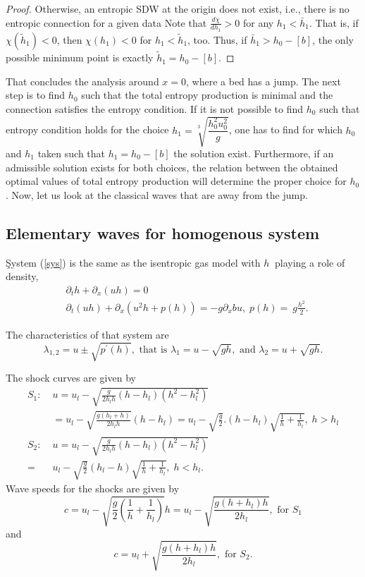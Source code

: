 \documentclass{article}
\theoremstyle{plain}
\theoremstyle{definition}
\theoremstyle{remark}
\begin{document}
\begin{proof}
Otherwise, an entropic SDW at the origin does not exist, i.e.,
there is no entropic connection for a given data
Note that $\frac{d\chi}{dh_1}>0$ for any $h_1<\bar{h}_1$. That is,
if $\chi(\tilde{h}_1)<0$, then $\chi(h_1)<0$ for $h_1<\tilde{h}_1$, too.
Thus, if $\bar{h}_1>h_0-[b]$, the only possible minimum point is
exactly $\tilde{h}_1=h_0-[b]$.
\end{proof}
\medskip


That concludes the analysis around $x=0$, where a bed has a jump. 
The next step is to find $ h_0 $ such that the total entropy production is minimal 
and the connection satisfies the entropy condition. 
If it is not possible to find $h_0$ such that entropy condition holds for the choice 
$h_1=\sqrt[3]{\dfrac{h_{0}^{2}u_{0}^{2}}{g}}$, 
one has to find for which $h_0$ and $h_1$ taken such that $h_1=h_0-[b]$ 
the solution exist. Furthermore, if an admissible solution exists for both choices, 
the relation between the obtained optimal values of total entropy production
will determine the proper choice for $ h_0$.
Now, let us look at the classical waves that are away from the jump.


\subsection{ Elementary waves for homogenous system}

Şystem (\ref{sys}) is the same as the isentropic gas model with
\(h\ \) playing a role of density,
\[
\begin{split} 
& \partial_{t}h + \partial_{x}(uh) = 0\\
& \partial_{t}(uh) + \partial_{x}\left( u^{2}h + p(h) \right) = 
- g\partial_{x}bu,\; p(h) = \ g\frac{h^{2}}{2}.
\end{split} \]

The characteristics of that system are 
\[\lambda_{1,2} = u \pm \sqrt{p^{'}(h)}, \text{ that is } 
\lambda_{1} = u - \sqrt{gh}, \text{ and } \lambda_{2} = u + \sqrt{gh}. \]

The shock curves are given by
\[ 
\begin{split} 
S_{1}:\; &  u = u_{l} - \sqrt{\frac{g}{2h_{l}h}\left( h - h_{l} \right)
\left( h^{2} - h_{l}^{2} \right)} \\ & 
= u_{l} - \sqrt{\frac{g\left( h_{l} + h \right)}{2h_{l}h}} \left( h - h_{l} 
\right)= u_{l} - \sqrt{\frac{g}{2}}.\left( h - h_{l} \right)
\sqrt{\frac{1}{h} + \frac{1}{h_{l}}}, \; h > h_{l} \\
S_{2}:\; &  u = u_{l} - \sqrt{\frac{g}{2h_{l}h}\left( h - h_{l} \right)
\left( h^{2} - h_{l}^{2} \right)} \\ = & u_{l} - \sqrt{\frac{g}{2}} \left( h_{l} 
- h \right)\sqrt{\frac{1}{h} + \frac{1}{h_{l}}}, \; h < h_{l}.
\end{split}
\]
Wave speeds for the shocks are given by
\[
c = u_{l} - \sqrt{\frac{g}{2}
\left( \frac{1}{h} + \frac{1}{h_{l}} \right)} h 
= u_{l} - \sqrt{\frac{g\left( h + h_{l} \right)h}{2h_{l}}},
\text{ for } S_{1}
\]
and
\[
c = u_{l} + \sqrt{\frac{g\left( h + h_{l} \right)h}{2h_{l}}}, \text{ for } S_{2}.
\]
\end{document}

